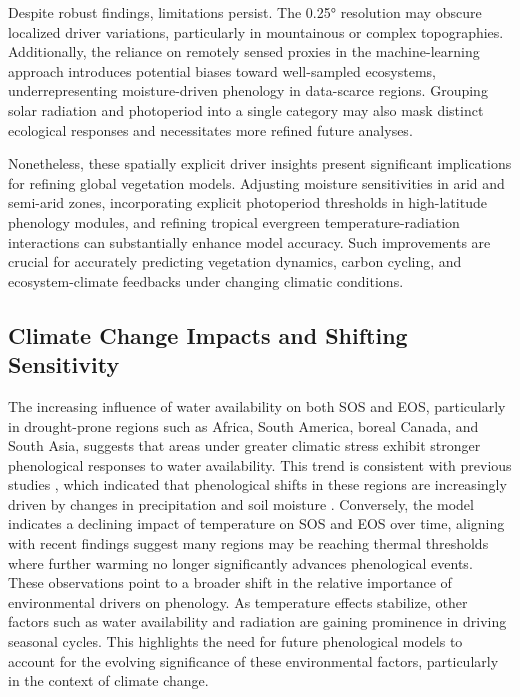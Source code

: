 \documentclass[pdflatex,sn-mathphys-num]{sn-jnl}%
\theoremstyle{thmstyleone}%
\theoremstyle{thmstyletwo}%
\theoremstyle{thmstylethree}%
\begin{document}
Despite robust findings, limitations persist. The 0.25° resolution may obscure localized driver variations, particularly in mountainous or complex topographies. Additionally, the reliance on remotely sensed proxies in the machine-learning approach introduces potential biases toward well-sampled ecosystems, underrepresenting moisture-driven phenology in data-scarce regions. Grouping solar radiation and photoperiod into a single category may also mask distinct ecological responses and necessitates more refined future analyses.

Nonetheless, these spatially explicit driver insights present significant implications for refining global vegetation models. Adjusting moisture sensitivities in arid and semi-arid zones, incorporating explicit photoperiod thresholds in high-latitude phenology modules, and refining tropical evergreen temperature-radiation interactions can substantially enhance model accuracy. Such improvements are crucial for accurately predicting vegetation dynamics, carbon cycling, and ecosystem-climate feedbacks under changing climatic conditions.

\subsection{Climate Change Impacts and Shifting Sensitivity}\label{subsec2}
The increasing influence of water availability on both SOS and EOS, particularly in drought-prone regions such as Africa, South America, boreal Canada, and South Asia, suggests that areas under greater climatic stress exhibit stronger phenological responses to water availability. This trend is consistent with previous studies \cite{wang_comparison_2022}, which indicated that phenological shifts in these regions are increasingly driven by changes in precipitation and soil moisture . Conversely, the model indicates a declining impact of temperature on SOS and EOS over time, aligning with recent findings suggest many regions may be reaching thermal thresholds where further warming no longer significantly advances phenological events\cite{lu_diminishing_2024}.
These observations point to a broader shift in the relative importance of environmental drivers on phenology. As temperature effects stabilize, other factors such as water availability and radiation are gaining prominence in driving seasonal cycles. This highlights the need for future phenological models to account for the evolving significance of these environmental factors, particularly in the context of climate change.
\end{document}

